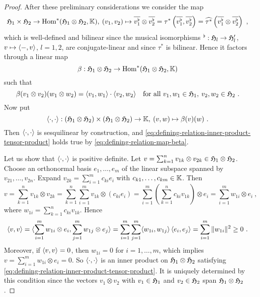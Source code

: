 \begin{proof}
  After these preliminary considerations we consider the map 
  \[
    \mathfrak{H}_1\times \mathfrak{H}_2 \to \operatorname{Hom}\nolimits^* (\mathfrak{H}_1\otimes \mathfrak{H}_2,\mathbb{K}) ,
    \: (v_1,v_2) \mapsto \overline{v_1^\flat} \otimes  \overline{v_2^\flat} = 
    \tau^* \left( \overline{v_1^\flat} , \overline{v_2^\flat}  \right)=
    \widehat{\tau^*}  \left( \overline{v_1^\flat} \otimes \overline{v_2^\flat}  \right)\ ,
  \]
  which is well-defined and bilinear since the musical isomorphisms
  ${}^\flat: \mathfrak{H}_l \to \mathfrak{H}_l'$, $v \mapsto  \langle  - ,v \rangle $, $l=1,2$,
  are conjugate-linear and  since $\tau^*$ is bilinear. Hence it factors through a linear map 
  \[
    \beta: \mathfrak{H}_1\otimes \mathfrak{H}_2 \to \operatorname{Hom}\nolimits^* (\mathfrak{H}_1\otimes \mathfrak{H}_2,\mathbb{K}) 
  \]
  such that
  \begin{equation}
  \label{eq:defining-relation-map-beta}
    \beta (v_1\otimes v_2) (w_1\otimes w_2) =  \langle v_1,w_1 \rangle \cdot \langle v_2,w_2 \rangle 
    \quad \text{for all } v_1,w_1\in \mathfrak{H}_1 , \: v_2,w_2\in \mathfrak{H}_2 \ . 
  \end{equation}
  Now put 
  \[
   \langle \cdot,\cdot \rangle : 
   (\mathfrak{H}_1 \otimes \mathfrak{H}_2) \times (\mathfrak{H}_1 \otimes \mathfrak{H}_2) 
   \to \mathbb{K}, \: (v,w) \mapsto \beta (v) (w) \ .  
  \]
  Then $\langle \cdot,\cdot \rangle$ is sesquilinear by construction, and 
  \eqref{eq:defining-relation-inner-product-tensor-product} holds true by 
  \eqref{eq:defining-relation-map-beta}.

  Let us show that $\langle \cdot,\cdot \rangle$ is positive definite. Let 
  $v = \sum_{k=1}^n v_{1k} \otimes v_{2k} \in \mathfrak{H}_1 \otimes \mathfrak{H}_2$. 
  Choose an orthonormal basis $e_1, \ldots , e_m$ of the linear subspace 
  spanned by $v_{21}, \ldots , v_{2n}$. Expand 
  $ v_{2k} = \sum_{i=1}^m c_{ki} e_i$ with $c_{k1}, \ldots , c_{km} \in \mathbb{K}$. 
  Then 
  \begin{equation}
    \label{eq:expansion-tensor-product-vector-orthonormal-basis-second-component}
    v = \sum_{k=1}^n v_{1k} \otimes v_{2k} =  \sum_{k=1}^n \sum_{i=1}^m   v_{1k} \otimes  (c_{ki} e_i) =
    \sum_{i=1}^m \left( \sum_{k=1}^n   c_{ki} v_{1k} \right) \otimes  e_i =
    \sum_{i=1}^m  w_{1i}  \otimes  e_i \ ,
  \end{equation}
  where $ w_{1i} = \sum_{k=1}^n   c_{ki} v_{1k} $. Hence
  \begin{equation}
    \label{eq:positivity-tensor-inner-product}
    \langle v,v \rangle =  \langle \sum_{i=1}^m  w_{1i}  \otimes  e_i,\sum_{j=1}^m  w_{1j}  \otimes  e_j  \rangle  
    = \sum_{i=1}^m \sum_{j=1}^m  \langle w_{1i},  w_{1j} \rangle \, \langle  e_i,e_j  \rangle =
     \sum_{i=1}^m \| w_{1i} \|^2 \geq 0 \ .
  \end{equation}
  Moreover, if $\langle v,v \rangle = 0$, then $w_{1i}=0$ for $i=1,\ldots , m$, which implies 
  $v=  \sum_{i=1}^m  w_{1i}  \otimes  e_i =0$. 
  So $ \langle \cdot,\cdot \rangle$ is an inner product on $\mathfrak{H}_1\otimes \mathfrak{H}_2$ satisfying
  \eqref{eq:defining-relation-inner-product-tensor-product}. It is uniquely determined by this 
  condition since the vectors $v_1\otimes v_2$ with $v_1\in \mathfrak{H}_1$ and $v_2\in \mathfrak{H}_2$  span
  $\mathfrak{H}_1\otimes \mathfrak{H}_2$.
\end{proof}

